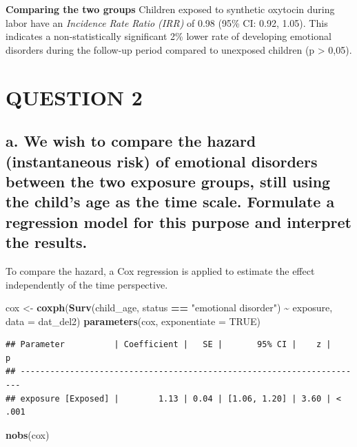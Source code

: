 \documentclass[
]{article}
\newenvironment{Shaded}{\begin{snugshade}}{\end{snugshade}}
\newcommand{\AttributeTok}[1]{\textcolor[rgb]{0.13,0.29,0.53}{#1}}
\newcommand{\ConstantTok}[1]{\textcolor[rgb]{0.56,0.35,0.01}{#1}}
\newcommand{\FunctionTok}[1]{\textcolor[rgb]{0.13,0.29,0.53}{\textbf{#1}}}
\newcommand{\NormalTok}[1]{#1}
\newcommand{\OtherTok}[1]{\textcolor[rgb]{0.56,0.35,0.01}{#1}}
\newcommand{\SpecialCharTok}[1]{\textcolor[rgb]{0.81,0.36,0.00}{\textbf{#1}}}
\newcommand{\StringTok}[1]{\textcolor[rgb]{0.31,0.60,0.02}{#1}}
\begin{document}
\textbf{Comparing the two groups} Children exposed to synthetic oxytocin
during labor have an \emph{Incidence Rate Ratio (IRR)} of 0.98 (95\% CI:
0.92, 1.05). This indicates a non-statistically significant 2\% lower
rate of developing emotional disorders during the follow-up period
compared to unexposed children (p \textgreater{} 0,05).

\section{QUESTION 2}\label{question-2}

\subsection{a. We wish to compare the hazard (instantaneous risk) of
emotional disorders between the two exposure groups, still using the
child's age as the time scale. Formulate a regression model for this
purpose and interpret the
results.}\label{a.-we-wish-to-compare-the-hazard-instantaneous-risk-of-emotional-disorders-between-the-two-exposure-groups-still-using-the-childs-age-as-the-time-scale.-formulate-a-regression-model-for-this-purpose-and-interpret-the-results.}

To compare the hazard, a Cox regression is applied to estimate the
effect independently of the time perspective.

\begin{Shaded}
\begin{Highlighting}[]
\NormalTok{cox }\OtherTok{\textless{}{-}} \FunctionTok{coxph}\NormalTok{(}\FunctionTok{Surv}\NormalTok{(child\_age, status }\SpecialCharTok{==} \StringTok{"emotional disorder"}\NormalTok{) }\SpecialCharTok{\textasciitilde{}}\NormalTok{ exposure, }
             \AttributeTok{data =}\NormalTok{ dat\_del2)}
\FunctionTok{parameters}\NormalTok{(cox, }\AttributeTok{exponentiate =} \ConstantTok{TRUE}\NormalTok{)}
\end{Highlighting}
\end{Shaded}

\begin{verbatim}
## Parameter          | Coefficient |   SE |       95% CI |    z |      p
## ----------------------------------------------------------------------
## exposure [Exposed] |        1.13 | 0.04 | [1.06, 1.20] | 3.60 | < .001
\end{verbatim}

\begin{Shaded}
\begin{Highlighting}[]
\FunctionTok{nobs}\NormalTok{(cox)}
\end{Highlighting}
\end{Shaded}
\end{document}
